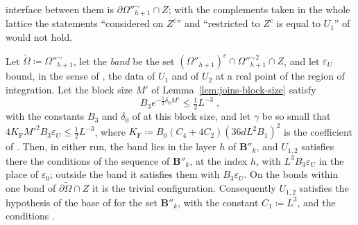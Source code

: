 interface between them is $\partial\Omega''^\sim_{h+1} \cap Z$; with the complements taken in the whole lattice the statements ``considered on $Z^c$'' and ``restricted to $Z^c$ is equal to $U_1$'' of \cite[p.~370, ll.~14--15; p.~371, ll.~26--27]{BalabanLFR2} would not hold.

\begin{lemma}\label{lem:glued-configuration}
Let $\tilde\Omega \coloneqq \Omega''^\sim_{h+1}$, let the \emph{band} be the set $(\Omega''_{h+1})^c \cap \Omega''^{\sim2}_{h+1} \cap Z$, and let $\varepsilon_U$ bound, in the sense of \cite[(7)]{BalabanVAR}, the data of $U_1$ and of $U_2$ at a real point of the region of integration. Let the block size $M'$ of Lemma~\ref{lem:joins-block-size} satisfy
\begin{equation}\label{eq:band-condition}
    B_3e^{-\frac{1}{2}\delta_0M'} \leq \tfrac{1}{2}L^{-3}\;,
\end{equation}
with the constants $B_3$ and $\delta_0$ of \cite[(162), p.~303]{BalabanVAR} at this block size, and let $\gamma$ be so small that $4K_{\mathrm F}M'^2B_3\varepsilon_U \leq \frac{1}{2}L^{-3}$, where $K_{\mathrm F} \coloneqq B_0(C_4 + 4C_2)(36dL^2B_1)^2$ is the coefficient of \cite[(165), p.~304]{BalabanVAR}. Then, in either run, the band lies in the layer $h$ of $\mathbf B''_k$, and $U_{1,2}$ satisfies there the conditions \cite[(2), p.~278]{BalabanVAR} of the sequence of $\mathbf B''_k$, at the index $h$, with $L^3B_3\varepsilon_U$ in the place of $\varepsilon_0$; outside the band it satisfies them with $B_3\varepsilon_U$. On the bonds within one bond of $\partial\tilde\Omega \cap Z$ it is the trivial configuration. Consequently $U_{1,2}$ satisfies the hypothesis \cite[(14), p.~280]{BalabanVAR} of the base of \cite[Sects.~D, E]{BalabanVAR} for the set $\mathbf B''_k$, with the constant $C_1 \coloneqq L^3$, and the conditions \cite[(3.35), (3.36)]{BalabanPBG}.
\end{lemma}

